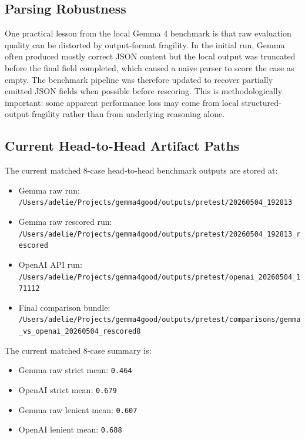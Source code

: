 \documentclass[11pt]{article}
\begin{document}
\subsection{Parsing Robustness}

One practical lesson from the local Gemma 4 benchmark is that raw evaluation quality can be distorted by output-format fragility. In the initial run, Gemma often produced mostly correct JSON content but the local output was truncated before the final field completed, which caused a naive parser to score the case as empty. The benchmark pipeline was therefore updated to recover partially emitted JSON fields when possible before rescoring. This is methodologically important: some apparent performance loss may come from local structured-output fragility rather than from underlying reasoning alone.

\subsection{Current Head-to-Head Artifact Paths}

The current matched 8-case head-to-head benchmark outputs are stored at:

\begin{itemize}[leftmargin=1.5em]
\item Gemma raw run: \texttt{/Users/adelie/Projects/gemma4good/outputs/pretest/20260504\_192813}
\item Gemma raw rescored run: \texttt{/Users/adelie/Projects/gemma4good/outputs/pretest/20260504\_192813\_rescored}
\item OpenAI API run: \texttt{/Users/adelie/Projects/gemma4good/outputs/pretest/openai\_20260504\_171112}
\item Final comparison bundle: \texttt{/Users/adelie/Projects/gemma4good/outputs/pretest/comparisons/gemma\_vs\_openai\_20260504\_rescored8}
\end{itemize}

The current matched 8-case summary is:

\begin{itemize}[leftmargin=1.5em]
\item Gemma raw strict mean: \texttt{0.464}
\item OpenAI strict mean: \texttt{0.679}
\item Gemma raw lenient mean: \texttt{0.607}
\item OpenAI lenient mean: \texttt{0.688}
\end{itemize}
\end{document}
